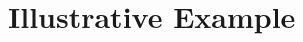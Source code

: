 \documentclass[twoside]{article}
\begin{document}
%
%
%


\section{Illustrative Example}\label{s:ex}
\end{document}
